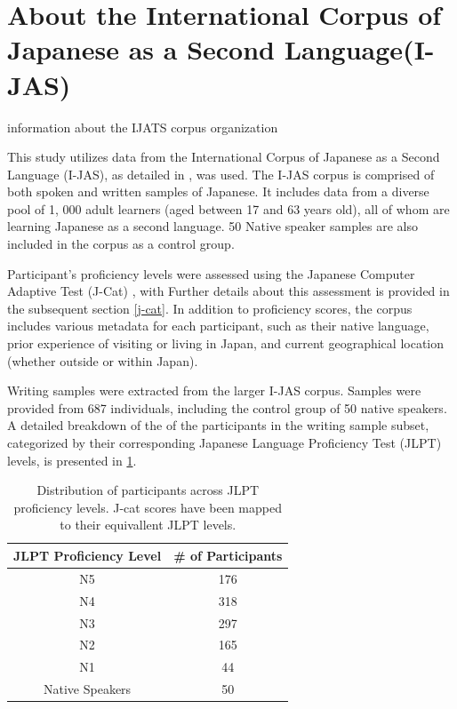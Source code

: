 \section{About the International Corpus of Japanese as a Second Language(I-JAS)}
information about the IJATS corpus organization

This study utilizes data from the International Corpus of Japanese as a Second Language (I-JAS), as
detailed in
\citet{Sakoda2020}, was
used.  The
I-JAS corpus is comprised of both spoken and written samples of Japanese.  It includes data from a diverse pool of 1,
000 adult learners
(aged
between 17 and 63 years old), all of whom are learning Japanese as a second language. 50 Native speaker samples are also
included in the corpus as a control group.

Participant's proficiency levels were assessed using the Japanese Computer Adaptive Test (J-Cat)
\citep{Imai2009}, with Further details about this assessment is provided in the
subsequent
section \ref{j-cat}. In addition to proficiency scores, the corpus includes various metadata for each participant,
such as
their
native language,
prior experience of visiting or living in Japan, and current geographical location (whether outside or within Japan).

Writing samples were extracted from the larger I-JAS corpus. Samples  were provided from 687 individuals, including the
control group
of 50 native speakers. A detailed breakdown of the of the participants in the writing sample subset, categorized by
their corresponding Japanese Language Proficiency Test (JLPT) levels, is presented in \ref{tab:participants-chart}.

\begin{table}
\centering
\begin{tabular}{cc}
\hline \textbf{JLPT Proficiency Level} & \textbf{\# of Participants} \\ \hline
N5 & 176 \\
N4  & 318 \\
N3 & 297\\
N2 & 165 \\
N1 & 44 \\
Native Speakers & 50 \\
\hline
\end{tabular}
\caption{\label{tab:participants-chart} Distribution of participants across JLPT proficiency levels. J-cat scores have been mapped to their equivallent JLPT levels. }
\end{table}


